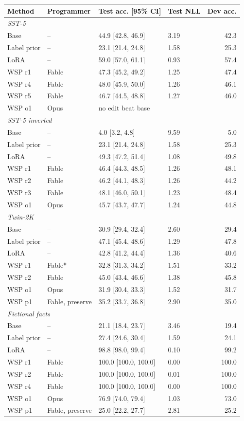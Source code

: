 \begin{tabular}{llllr}
\toprule
Method & Programmer & Test acc. [95\% CI] & Test NLL & Dev acc. \\
\midrule
\multicolumn{5}{l}{\textit{SST-5}} \\
Base & -- & 44.9 \tiny[42.8, 46.9] & 3.19 & 42.3 \\
Label prior & -- & 23.1 \tiny[21.4, 24.8] & 1.58 & 25.3 \\
LoRA & -- & 59.0 \tiny[57.0, 61.1] & 0.93 & 57.4 \\
WSP r1 & Fable & 47.3 \tiny[45.2, 49.2] & 1.25 & 47.4 \\
WSP r4 & Fable & 48.0 \tiny[45.9, 50.0] & 1.26 & 46.1 \\
WSP r5 & Fable & 46.7 \tiny[44.5, 48.8] & 1.27 & 46.0 \\
WSP o1 & Opus & \multicolumn{3}{l}{no edit beat base} \\
\multicolumn{5}{l}{\textit{SST-5 inverted}} \\
Base & -- & 4.0 \tiny[3.2, 4.8] & 9.59 & 5.0 \\
Label prior & -- & 23.1 \tiny[21.4, 24.8] & 1.58 & 25.3 \\
LoRA & -- & 49.3 \tiny[47.2, 51.4] & 1.08 & 49.8 \\
WSP r1 & Fable & 46.4 \tiny[44.3, 48.5] & 1.26 & 48.1 \\
WSP r2 & Fable & 46.2 \tiny[44.1, 48.3] & 1.26 & 44.2 \\
WSP r3 & Fable & 48.1 \tiny[46.0, 50.1] & 1.23 & 48.4 \\
WSP o1 & Opus & 45.7 \tiny[43.7, 47.7] & 1.24 & 44.8 \\
\multicolumn{5}{l}{\textit{Twin-2K}} \\
Base & -- & 30.9 \tiny[29.4, 32.4] & 2.60 & 29.4 \\
Label prior & -- & 47.1 \tiny[45.4, 48.6] & 1.29 & 47.8 \\
LoRA & -- & 42.8 \tiny[41.2, 44.4] & 1.36 & 40.6 \\
WSP r1 & Fable* & 32.8 \tiny[31.3, 34.2] & 1.51 & 33.2 \\
WSP r2 & Fable & 45.0 \tiny[43.4, 46.6] & 1.38 & 45.8 \\
WSP o1 & Opus & 31.9 \tiny[30.4, 33.3] & 1.52 & 31.7 \\
WSP p1 & Fable, preserve & 35.2 \tiny[33.7, 36.8] & 2.90 & 35.0 \\
\multicolumn{5}{l}{\textit{Fictional facts}} \\
Base & -- & 21.1 \tiny[18.4, 23.7] & 3.46 & 19.4 \\
Label prior & -- & 27.4 \tiny[24.6, 30.4] & 1.59 & 24.1 \\
LoRA & -- & 98.8 \tiny[98.0, 99.4] & 0.10 & 99.2 \\
WSP r1 & Fable & 100.0 \tiny[100.0, 100.0] & 0.00 & 100.0 \\
WSP r2 & Fable & 100.0 \tiny[100.0, 100.0] & 0.01 & 100.0 \\
WSP r4 & Fable & 100.0 \tiny[100.0, 100.0] & 0.00 & 100.0 \\
WSP o1 & Opus & 76.9 \tiny[74.0, 79.4] & 1.03 & 73.0 \\
WSP p1 & Fable, preserve & 25.0 \tiny[22.2, 27.7] & 2.81 & 25.2 \\
\bottomrule
\end{tabular}
